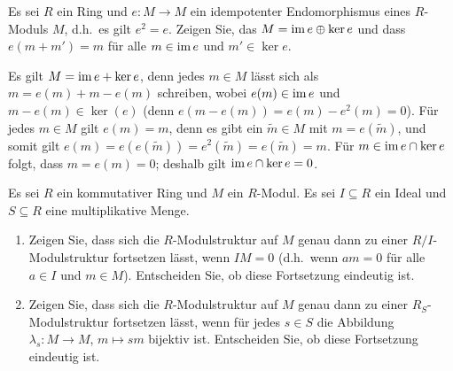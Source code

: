 \begin{question}
  Es sei $R$ ein Ring und $e \colon M \to M$ ein idempotenter Endomorphismus eines $R$-Moduls $M$, d.h.\ es gilt $e^2 = e$.
  Zeigen Sie, das $M = \operatorname{im} e \oplus \ker e$ und dass $e(m + m') = m$ für alle $m \in \operatorname{im} e$ und $m' \in \ker e$.
\end{question}


\begin{solution}
  Es gilt $M = \operatorname{im} e + \ker e$, denn jedes $m \in M$ lässt sich als $m = e(m) + m - e(m)$ schreiben, wobei $e(m) \in \operatorname{im} e$ und $m - e(m) \in \ker(e)$ (denn $e(m - e(m)) = e(m) - e^2(m) = 0$).
  Für jedes $m \in M$ gilt $e(m) = m$, denn es gibt ein $\tilde{m} \in M$ mit $m = e(\tilde{m})$, und somit gilt $e(m) = e(e(\tilde{m})) = e^2(\tilde{m}) = e(\tilde{m}) = m$.
  Für $m \in \operatorname{im} e \cap \ker e$ folgt, dass $m = e(m) = 0$;
  deshalb gilt $\operatorname{im} e \cap \ker e = 0$.
\end{solution}


\begin{question}
  \label{question: extension of module structures onto quotients and localizations}
  Es sei $R$ ein kommutativer Ring und $M$ ein $R$-Modul.
  Es sei $I \subseteq R$ ein Ideal und $S \subseteq R$ eine multiplikative Menge.
  \begin{enumerate}
    \item
      Zeigen Sie, dass sich die $R$-Modulstruktur auf $M$ genau dann zu einer $R/I$-Modulstruktur fortsetzen lässt, wenn $IM =  0$ (d.h.\ wenn $am = 0$ für alle $a \in I$ und $m \in M$).
      Entscheiden Sie, ob diese Fortsetzung eindeutig ist.
    \item
      Zeigen Sie, dass sich die $R$-Modulstruktur auf $M$ genau dann zu einer $R_S$-Modulstruktur fortsetzen lässt, wenn für jedes $s \in S$ die Abbildung $\lambda_s \colon M \to M$, $m \mapsto sm$ bijektiv ist.
      Entscheiden Sie, ob diese Fortsetzung eindeutig ist.
  \end{enumerate}
\end{question}


